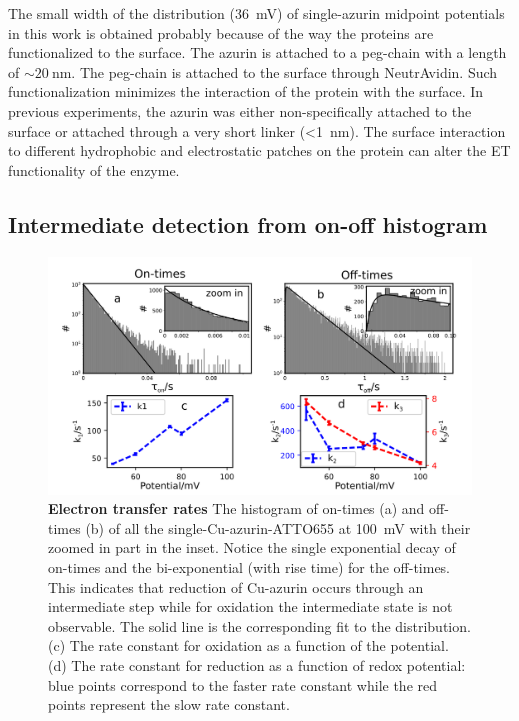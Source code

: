 \documentclass[journal=jacsat,manuscript=article]{achemso}
\begin{document}
The small width of the distribution (\SI{36}{\mV}) of single-azurin midpoint potentials in this work is obtained probably because of the way the proteins are functionalized to the surface.
The azurin is attached to a peg-chain with a length of ${\sim}\SI{20}{\nm}$.
The peg-chain is attached to the surface through NeutrAvidin.
Such functionalization minimizes the interaction of the protein with the surface.
In previous experiments, the azurin was either non-specifically attached to the surface or attached through a very short linker (<\SI{1}{\nm}).
The surface interaction to different hydrophobic and electrostatic patches on the protein can alter the ET functionality of the enzyme.

\subsection{Intermediate detection from on-off histogram}
\begin{figure}
	\centering
	\includegraphics[width=\textwidth]{many_sm_hist}
	\caption{\textbf{Electron transfer rates} The histogram of on-times (a) and off-times (b) of all the single-Cu-azurin-ATTO655 at \SI{100}{\mV} with their zoomed in part in the inset.
	Notice the single exponential decay of on-times and the bi-exponential (with rise time) for the off-times.
	This indicates that  reduction of Cu-azurin occurs through an intermediate step while for oxidation the intermediate state is not observable.
	The solid line is the corresponding fit to the distribution.
	(c) The rate constant for oxidation as a function of the potential. 
	(d) The rate constant for reduction as a function of redox potential: blue points correspond to the faster rate constant while the red points represent the slow rate constant.}
	\label{fig:many_sm_hist}
\end{figure}
\end{document}
